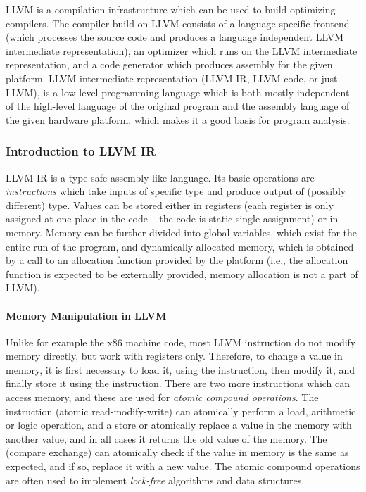 LLVM is a compilation infrastructure which can be used to build optimizing compilers.
The compiler build on LLVM consists of a language-specific frontend (which processes the source code and produces a language independent LLVM intermediate representation), an optimizer which runs on the LLVM intermediate representation, and a code generator which produces assembly for the given platform.
LLVM intermediate representation (LLVM IR, LLVM code, or just LLVM), is a low-level programming language which is both mostly independent of the high-level language of the original program and the assembly language of the given hardware platform, which makes it a good basis for program analysis.

\subsubsection{Introduction to LLVM IR}

LLVM IR is a type-safe assembly-like language.
Its basic operations are \emph{instructions} which take inputs of specific type and produce output of (possibly different) type.
Values can be stored either in registers (each register is only assigned at one place in the code -- the code is static single assignment) or in memory.
Memory can be further divided into global variables, which exist for the entire run of the program, and dynamically allocated memory, which is obtained by a call to an allocation function provided by the platform (i.e., the allocation function is expected to be externally provided, memory allocation is not a part of LLVM).

\paragraph{Memory Manipulation in LLVM}
Unlike for example the x86 machine code, most LLVM instruction do not modify memory directly, but work with registers only.
Therefore, to change a value in memory, it is first necessary to load it, using the  instruction, then modify it, and finally store it using the  instruction.
There are two more instructions which can access memory, and these are used for \emph{atomic compound operations}.
The  instruction (atomic read-modify-write) can atomically perform a load, arithmetic or logic operation, and a store or atomically replace a value in the memory with another value, and in all cases it returns the old value of the memory.
The  (compare exchange) can atomically check if the value in memory is the same as expected, and if so, replace it with a new value.
The atomic compound operations are often used to implement \emph{lock-free} algorithms and data structures.

